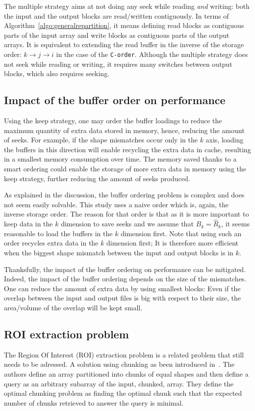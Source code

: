 \documentclass[sigconf, nonacm]{acmart}
\begin{document}
The multiple strategy
aims at not doing any seek while reading \textit{and} writing:
both the input and the output blocks are read/written contiguously. In
terms of Algorithm~\ref{algo:generalrepartition}, it means defining read blocks as
contiguous parts of the input array and write blocks as contiguous parts of
the output arrays. It is equivalent to extending the read buffer in the inverse of
the storage order: $k \rightarrow j \rightarrow i$ in the case
of the \texttt{C-order}. Although the multiple strategy does not seek while reading or writing, it
requires many switches between output blocks, which also requires seeking.

\subsection{Impact of the buffer order on performance}
Using the keep strategy, one may order the buffer loadings to reduce the maximum
quantity of extra data stored in memory, hence, reducing the amount of seeks.
For example, if the shape mismatches occur only in the $k$ axis, loading the
buffers in this direction will enable recycling the extra data in cache,
resulting in a smallest memory consumption over time.
The memory saved thanks to a smart
ordering could enable the storage of more extra data in memory using the
keep strategy, further reducing the amount of seeks produced.

As explained in the discussion, the buffer ordering problem is complex and does
not seem easily solvable.
This study uses a naive order which is, again, the inverse storage order.
The reason for that order is that as it is more important to keep data in the
$k$ dimension to save seeks and we assume that $B_k=\hat R_k$, it seems
reasonable to load the buffers in the $k$ dimension first.
Note that using such
an order recycles extra data in the $k$ dimension first; It is therefore
more efficient when the biggest shape mismatch between the input and output
blocks is in $k$.

Thanksfully, the impact of the buffer ordering on performance can be
mitigated. Indeed, the impact of the buffer ordering depends on the size of the
mismatches. One can reduce the amount of extra data by using smallest blocks: Even
if the overlap between the input and output files is big with respect to their
size, the area/volume of the overlap will be kept small.

\subsection{ROI extraction problem}
The Region Of Interest (ROI) extraction problem is a related problem that still
needs to be adressed.
A solution using chunking as been introduced in~\cite{optimal_chuking}.
The authors define an array partitioned into chunks of equal shapes and then
define a query as an arbitrary subarray of the input, chunked, array.
They define the optimal chunking problem as finding the optimal chunk such
that the expected number of chunks retrieved to answer the query is minimal.
\end{document}
